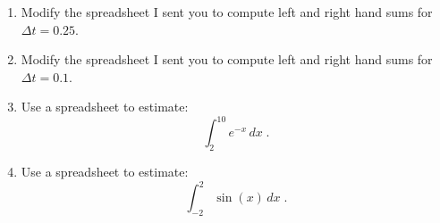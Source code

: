 \documentclass[12pt]{article}
\begin{document}
\begin{enumerate}
\setlength{\itemsep}{-1mm}
  \item Modify the spreadsheet I sent you to compute left and right
    hand sums for $\Delta t = 0.25$.
  \item Modify the spreadsheet I sent you to compute left and right
    hand sums for $\Delta t = 0.1$.
  \item Use a spreadsheet to estimate:
\begin{equation}
  \int_2^{10}e^{-x} \, dx \;.
\end{equation}
  \item Use a spreadsheet to estimate:
\begin{equation}
  \int_{-2}^2\sin(x) \, dx \;.
\end{equation}

\end{enumerate}



 
\end{document}
